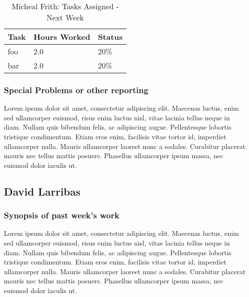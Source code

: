 \documentclass[12pt,article,compsoc]{IEEEtran}
\begin{document}
	\begin{table}[ht]
	\renewcommand{\arraystretch}{1.3}
		\caption{Micheal Frith: Tasks Assigned - Next Week}
		
		\label{Summary of Micheal Frith's activities: this week}
		
		\centering
		\begin{tabular}{p{5.5cm}|p{1cm}|p{1cm}}
		\hline
		\bfseries 	Task		 		& \bfseries Hours Worked	& \bfseries Status	\\
		\hline\hline
					foo					& 2.0						& 20\%				\\	%
					bar					& 2.0						& 20\%				\\	
		\hline
		\end{tabular}
	\end{table}

	\subsubsection*{Special Problems or other reporting}
	Lorem ipsum dolor sit amet, consectetur adipiscing elit. Maecenas luctus, enim sed ullamcorper euismod, risus enim luctus nisl, vitae lacinia tellus neque in diam. Nullam quis bibendum felis, ac adipiscing augue. Pellentesque lobortis tristique condimentum. Etiam eros enim, facilisis vitae tortor id, imperdiet ullamcorper nulla. Mauris ullamcorper laoreet nunc a sodales. Curabitur placerat mauris nec tellus mattis posuere. Phasellus ullamcorper ipsum massa, nec euismod dolor iaculis ut.

\subsection{David Larribas}

	\subsubsection*{Synopsis of past week's work}

	Lorem ipsum dolor sit amet, consectetur adipiscing elit. Maecenas luctus, enim sed ullamcorper euismod, risus enim luctus nisl, vitae lacinia tellus neque in diam. Nullam quis bibendum felis, ac adipiscing augue. Pellentesque lobortis tristique condimentum. Etiam eros enim, facilisis vitae tortor id, imperdiet ullamcorper nulla. Mauris ullamcorper laoreet nunc a sodales. Curabitur placerat mauris nec tellus mattis posuere. Phasellus ullamcorper ipsum massa, nec euismod dolor iaculis ut.
\end{document}
